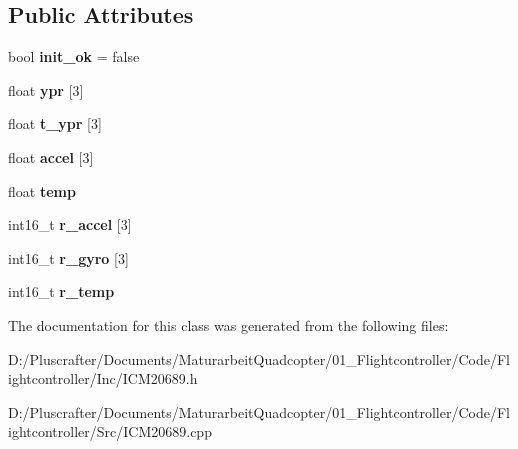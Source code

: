 \subsection*{Public Attributes}
\begin{DoxyCompactItemize}
\item 
\mbox{\label{class_sensor_1_1_i_c_m20689_a96f49ad48194b235c49ded1afa1c3cd4}} 
bool {\bfseries init\+\_\+ok} = false
\item 
\mbox{\label{class_sensor_1_1_i_c_m20689_a4cf8a0559d1c60070c1ae02363ffc0e1}} 
float {\bfseries ypr} \mbox{[}3\mbox{]}
\item 
\mbox{\label{class_sensor_1_1_i_c_m20689_a7c9c016f5f8d18d60f29d976ba1dd618}} 
float {\bfseries t\+\_\+ypr} \mbox{[}3\mbox{]}
\item 
\mbox{\label{class_sensor_1_1_i_c_m20689_ac0f4196adb47fe67498cf6a2dea02844}} 
float {\bfseries accel} \mbox{[}3\mbox{]}
\item 
\mbox{\label{class_sensor_1_1_i_c_m20689_a8d69e8d9089087f8b766420721f10341}} 
float {\bfseries temp}
\item 
\mbox{\label{class_sensor_1_1_i_c_m20689_a0a4a21026e7dbf9a3021916fa8cfee0e}} 
int16\+\_\+t {\bfseries r\+\_\+accel} \mbox{[}3\mbox{]}
\item 
\mbox{\label{class_sensor_1_1_i_c_m20689_a25704a17a8f0ed87a738d0365df43249}} 
int16\+\_\+t {\bfseries r\+\_\+gyro} \mbox{[}3\mbox{]}
\item 
\mbox{\label{class_sensor_1_1_i_c_m20689_ae5408ef7e1bfd9a3cfe76ef6c9516d1d}} 
int16\+\_\+t {\bfseries r\+\_\+temp}
\end{DoxyCompactItemize}


The documentation for this class was generated from the following files\+:\begin{DoxyCompactItemize}
\item 
D\+:/\+Pluscrafter/\+Documents/\+Maturarbeit\+Quadcopter/01\+\_\+\+Flightcontroller/\+Code/\+Flightcontroller/\+Inc/I\+C\+M20689.\+h\item 
D\+:/\+Pluscrafter/\+Documents/\+Maturarbeit\+Quadcopter/01\+\_\+\+Flightcontroller/\+Code/\+Flightcontroller/\+Src/I\+C\+M20689.\+cpp\end{DoxyCompactItemize}
